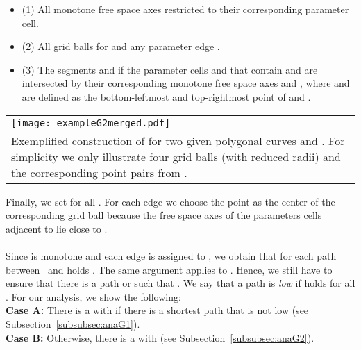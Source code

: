 \documentclass[a4paper,11pt]{article}
\begin{document}
\noindent\begin{minipage}{0.52\linewidth}\vspace*{2ex}

	\begin{itemize}
		\item (1) All monotone free space axes restricted to their corresponding parameter cell.  
		\item (2) All grid balls  for  and any parameter edge . 
		\item (3) The segments  and  if the parameter cells  and  that contain  and  are intersected by their corresponding monotone free space axes  and , where  and  are defined as the  bottom-leftmost and  top-rightmost point of  and .
	\end{itemize}
	
\end{minipage}
\begin{minipage}{0.4\linewidth}\vspace*{2ex}
\begin{center}
    \begin{tabular}{p{6cm}}
      \texttt{[image: exampleG2merged.pdf]}\\ 
{\small Exemplified construction of  for two given polygonal curves  and .  For simplicity we only illustrate four grid balls (with reduced radii) and the corresponding point pairs from .}
    \end{tabular}
  \end{center}
\end{minipage}\vspace*{2ex}

Finally, we set  for all . 
For each edge  we choose the point  as the center of the corresponding grid ball because the free space axes of the parameters cells adjacent to  lie close to . \\  \\
Since  is monotone and each edge  is assigned to , we obtain that for each path  between~ and  holds .  The same argument applies to . Hence, we still have to ensure that there is a path  or  such that . We say that a path  is \emph{low} if  holds for all .  For our analysis, we show the following:\\
	{\bf Case A: }  There is a  with  if there is a shortest path  that is not low (see Subsection~\ref{subsubsec:anaG1}).\\
	{\bf Case B:}  Otherwise, there is a  with  (see Subsection~\ref{subsubsec:anaG2}).
\end{document}
